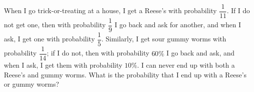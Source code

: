 When I go trick-or-treating at a house, I get a Reese's with probability $\dfrac1{11}$. If I do not get one, then with probability $\dfrac19$ I go back and ask for another, and when I ask, I get one with probability $\dfrac15$. Similarly, I get sour gummy worms with probability $\dfrac1{14}$; if I do not, then with probability $60\%$ I go back and ask, and when I ask, I get them with probability $10\%$. I can never end up with both a Reese's and gummy worms. What is the probability that I end up with a Reese's or gummy worms?

